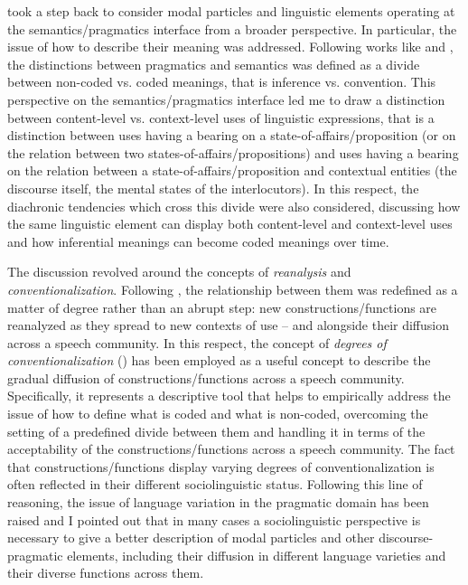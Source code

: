  took a step back to consider modal particles and linguistic elements operating at the semantics/pragmatics interface from a broader perspective. In particular, the issue of how to describe their meaning was addressed. Following works like \citet{Hansen2008,Hansen2012} and \citet{Ariel2008,Ariel2010}, the distinctions between pragmatics and semantics was defined as a divide between non-coded vs. coded meanings, that is inference vs. convention. This perspective on the semantics/pragmatics interface led me to draw a distinction between content-level vs. context-level uses of linguistic expressions, that is a distinction between uses having a bearing on a state-of-affairs/proposition (or on the relation between two states-of-affairs/propositions) and uses having a bearing on the relation between a state-of-affairs/proposition and contextual entities (the discourse itself, the mental states of the interlocutors). In this respect, the diachronic tendencies which cross this divide were also considered, discussing how the same linguistic element can display both content-level and context-level uses and how inferential meanings can become coded meanings over time.

The discussion revolved around the concepts of \textit{reanalysis} and \textit{conventionalization}. Following \citet{Smet2009,Smet2012,Smet2014}, the relationship between them was redefined as a matter of degree rather than an abrupt step: new constructions/functions are reanalyzed as they spread to new contexts of use – and alongside their diffusion across a speech community. In this respect, the concept of \textit{degrees of conventionalization} (\citealt{EhmerRosemeyer2018}) has been employed as a useful concept to describe the gradual diffusion of constructions/functions across a speech community. Specifically, it represents a descriptive tool that helps to empirically address the issue of how to define what is coded and what is non-coded, overcoming the setting of a predefined divide between them and handling it in terms of the acceptability of the constructions/functions across a speech community. The fact that constructions/functions display varying degrees of conventionalization is often reflected in their different sociolinguistic status. Following this line of reasoning, the issue of language variation in the pragmatic domain has been raised and I pointed out that in many cases a sociolinguistic perspective is necessary to give a better description of modal particles and other discourse-pragmatic elements, including their diffusion in different language varieties and their diverse functions across them.

